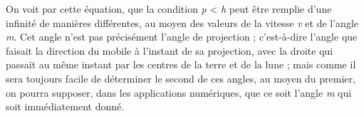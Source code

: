 \documentclass[a4paper, 11pt, oneside, polutonikogreek, french]{article}
\begin{document}

On voit par cette équation, que la condition \emph{p} < \emph{h} peut être remplie d'une infinité de manières différentes, au moyen des valeurs de la vitesse \emph{v} et de l'angle \emph{m}. Cet angle n'est pas précisément l'angle de projection ; c'est-à-dire l'angle que faisait la direction du mobile à l'instant de sa projection, avec la droite qui passait au même instant par les centres de la terre et de la lune ; mais comme il sera toujours facile de déterminer le second de ces angles, au moyen du premier, on pourra supposer, dans les applications numériques, que ce soit l'angle \emph{m} qui soit immédiatement donné.

\end{document}
